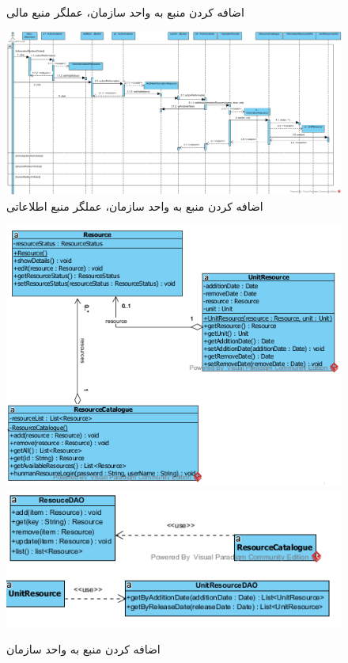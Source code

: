 \begin{landscape}
\begin{figure}[H]
	\caption{اضافه کردن منبع به واحد سازمان، عملگر منبع مالی}
\end{figure}
\begin{figure}[H]
	\centering
	\includegraphics[scale=0.5]{img/sequence-design/AddResourceToUnit_INFORMATION}
	\caption{اضافه کردن منبع به واحد سازمان، عملگر منبع اطلاعاتی}
\end{figure}

\begin{figure}[H]
	\centering
	\includegraphics[scale=0.9]{img/sequence-design/AddResourceToUnitC}
	\includegraphics[scale=0.9]{img/sequence-design/AddResourceToUnitD}	
	\caption{اضافه کردن منبع به واحد سازمان}
\end{figure}


\end{landscape}
